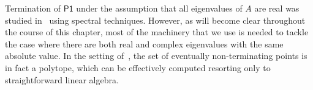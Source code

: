 

Termination of $\mathsf{P1}$ under the assumption that all eigenvalues
of $A$ are real was studied in~\cite{RMM} using spectral
techniques. However, as will become clear throughout the course of
this chapter, most of the machinery that we use is needed to tackle the
case where there are both real and complex eigenvalues with the same
absolute value. In the setting of~\cite{RMM}, the set of
eventually non-terminating points is in fact a polytope, which can be
effectively computed resorting only to straightforward linear algebra.


